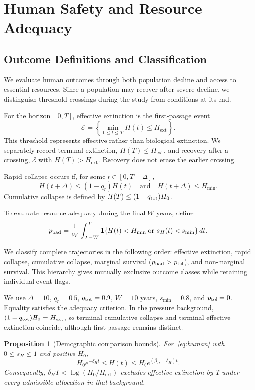 \documentclass[12pt,a4paper]{article}
\newtheorem{proposition}{Proposition}[section]
\theoremstyle{remark}
\newcommand{\ind}{\mathbf{1}}
\newcommand{\Hext}{H_{\mathrm{ext}}}
\newcommand{\Hmin}{H_{\min}}
\begin{document}
\section{Human Safety and Resource Adequacy}\label{sec:safety}

\subsection{Outcome Definitions and Classification}

We evaluate human outcomes through both population decline and access to essential resources. Since a population may recover after severe decline, we distinguish threshold crossings during the study from conditions at its end.

For the horizon $[0,T]$, effective extinction is the first-passage event
\begin{equation}\label{eq:ext}
\mathcal E=\left\{\min_{0\le t\le T}H(t)\le\Hext\right\}.
\end{equation}
This threshold represents effective rather than biological extinction. We separately record terminal extinction, $H(T)\le\Hext$, and recovery after a crossing, $\mathcal E$ with $H(T)>\Hext$. Recovery does not erase the earlier crossing.

Rapid collapse occurs if, for some $t\in[0,T-\Delta]$,
\[
H(t+\Delta)\le(1-q_r)H(t)
\quad\text{and}\quad
H(t+\Delta)\le\Hmin.
\]
Cumulative collapse is defined by
$H(T)\le(1-q_{\rm tot})H_0$.

To evaluate resource adequacy during the final $W$ years, define
\begin{equation}\label{eq:pbad}
p_{\rm bad}=\frac1W\int_{T-W}^{T}
\ind\{H(t)<\Hmin\ \text{or}\ s_H(t)<s_{\min}\}\,dt.
\end{equation}

We classify complete trajectories in the following order: effective extinction, rapid collapse, cumulative collapse, marginal survival ($p_{\rm bad}>p_{\rm tol}$), and non-marginal survival. This hierarchy gives mutually exclusive outcome classes while retaining individual event flags.

We use $\Delta=10$, $q_r=0.5$, $q_{\rm tot}=0.9$, $W=10$ years, $s_{\min}=0.8$, and $p_{\rm tol}=0$. Equality satisfies the adequacy criterion. In the pressure background, $(1-q_{\rm tot})H_0=\Hext$, so terminal cumulative collapse and terminal effective extinction coincide, although first passage remains distinct.

\begin{proposition}[Demographic comparison bounds]\label{prop:bounds}
For~\eqref{eq:human} with $0\le s_H\le1$ and positive $H_0$,
\begin{equation}\label{eq:bounds}
H_0e^{-\delta_Ht}\le H(t)\le H_0e^{(\beta_H-\delta_H)t}.
\end{equation}
Consequently, $\delta_HT<\log(H_0/\Hext)$ excludes effective extinction by $T$ under every admissible allocation in that background.
\end{proposition}
\end{document}
